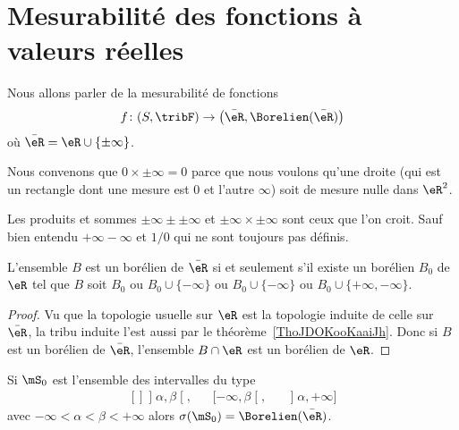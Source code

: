 \section{Mesurabilité des fonctions à valeurs réelles}

Nous allons parler de la mesurabilité de fonctions
\begin{equation}
    f\colon (S,\tribF)\to \big( \bar \eR,\Borelien(\bar \eR) \big)
\end{equation}
où \( \bar \eR=\eR\cup\{ \pm\infty \}\).

\begin{normaltext}      \label{normooGAAJooUPCbzG}
Nous convenons que \( 0\times\pm\infty=0\) parce que nous voulons qu'une droite (qui est un rectangle dont une mesure est \( 0\) et l'autre \( \infty\)) soit de mesure nulle dans \( \eR^2\).

Les produits et sommes \( \pm\infty\pm\pm\infty\) et \( \pm\infty\times \pm\infty\) sont ceux que l'on croit. Sauf bien entendu \( +\infty-\infty\) et \( 1/0\) qui ne sont toujours pas définis.
\end{normaltext}

\begin{lemma}       \label{LEMooBLOLooAdNViv}
    L'ensemble \( B\) est un borélien de \( \bar \eR\) si et seulement s'il existe un borélien \( B_0\) de \( \eR\) tel que \( B\) soit \( B_0\) ou \( B_0\cup\{ -\infty \}\) ou \( B_0\cup\{ -\infty \}\) ou \( B_0\cup\{ +\infty,-\infty \}\).
\end{lemma}

\begin{proof}
    Vu que la topologie usuelle sur \( \eR\) est la topologie induite de celle sur \( \bar \eR\), la tribu induite l'est aussi par le théorème~\ref{ThoJDOKooKaaiJh}. Donc si \( B\) est un borélien de \( \bar \eR\), l'ensemble \( B\cap \eR\) est un borélien de \( \eR\).
\end{proof}

\begin{lemma}       \label{LemooCRVJooQosHPq}
    Si \( \mS_0\) est l'ensemble des intervalles du type
    \begin{equation}
        \begin{aligned}[]
        \mathopen] \alpha , \beta \mathclose[,&&\mathopen[ -\infty , \beta \mathclose[,&&\mathopen] \alpha , +\infty \mathclose]
        \end{aligned}
    \end{equation}
    avec \( -\infty<\alpha<\beta<+\infty\) alors \( \sigma(\mS_0)=\Borelien(\bar\eR)\).
\end{lemma}

